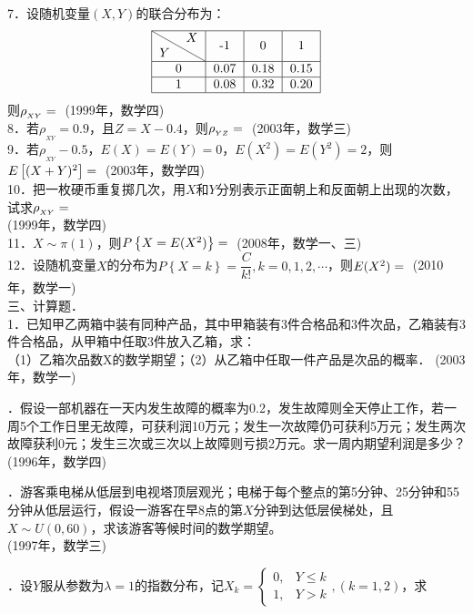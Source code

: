 \documentclass{ctexart}
\newcommand{\shortlabel}[1]
{
	\hfill
	{\small(#1)}\ignorespaces
}
\newcommand{\longlabel}[1]
{
	\\
	\hspace*{0mm}
	\hfill
	{\small(#1)}\ignorespaces
}
\newenvironment{answer}
{
	\begin{mdframed}[backgroundcolor=gray!40, hidealllines=true, skipabove=0pt, skipbelow=0pt]
	\noindent\ignorespaces
}
{  
	\end{mdframed}
}
\begin{document}
7．设随机变量$(X,Y)$的联合分布为：
$$
\begin{tabular}{|c|c|c|c|}
	\hline
	\diagbox{$Y$}{$X$} & -1 & 0 & 1 \\
	\hline
	0 & 0.07 & 0.18 & 0.15 \\
	\hline
	1 & 0.08 & 0.32 & 0.20\\
	\hline
\end{tabular}
$$
则$\rho_{_{XY}}=\uline{}$\shortlabel{1999年，数学四}\\
8．若$\rho_{_{XY}}=0.9$，且$Z=X-0.4$，则$\rho_{_{YZ}}=\uline{}$\shortlabel{2003年，数学三}\\
9．若$\rho_{_{XY}}-0.5$，$E(X)=E(Y)=0$，$E(X^2)=E(Y^2)=2$，则$E\left[(X+Y)^2\right]=\uline{}$\shortlabel{2003年，数学四}\\
10．把一枚硬币重复掷几次，用$X$和$Y$分别表示正面朝上和反面朝上出现的次数，试求$\rho_{_{XY}}=\uline{}$\longlabel{1999年，数学四}\\
11．$X\sim \pi(1)$，则$P\left\{X=E(X^2)\right\}=\uline{}$\shortlabel{2008年，数学一、三}\\
12．设随机变量$X$的分布为$P\left\{X=k\right\}=\dfrac{C}{k!},k=0,1,2,\cdots$，则$E(X^2)=\uline{}$\shortlabel{2010年，数学一}\\
三、计算题．\\
1．已知甲乙两箱中装有同种产品，其中甲箱装有3件合格品和3件次品，乙箱装有3件合格品，从甲箱中任取3件放入乙箱，求：\\ 
（1）乙箱次品数X的数学期望；（2）从乙箱中任取一件产品是次品的概率．\shortlabel{2003年，数学一}\par\medskip
\begin{answer}
\end{answer}
2．假设一部机器在一天内发生故障的概率为0.2，发生故障则全天停止工作，若一周5个工作日里无故障，可获利润10万元；发生一次故障仍可获利5万元；发生两次故障获利0元；发生三次或三次以上故障则亏损2万元。求一周内期望利润是多少？\shortlabel{1996年，数学四}\par\medskip
\begin{answer}
\end{answer}
3．游客乘电梯从低层到电视塔顶层观光；电梯于每个整点的第5分钟、25分钟和55分钟从低层运行，假设一游客在早8点的第$X$分钟到达低层侯梯处，且$X\sim U(0,60)$，求该游客等候时间的数学期望。\longlabel{1997年，数学三}\par\medskip
\begin{answer}
\end{answer}
4．设$Y$服从参数为$\lambda=1$的指数分布，记$X_k=
\begin{cases}
0,&Y\le k\\
1,&Y>k
\end{cases},(k=1,2)$，求\\
\end{document}
